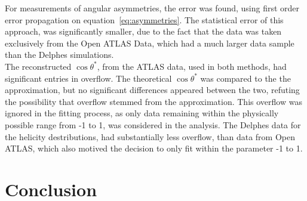 \documentclass[12pt,a4paper]{article}
\numberwithin{equation}{section}
\begin{document}
For measurements of angular asymmetries, the error was found, using first order
error propagation on equation~\eqref{eq:asymmetries}. The statistical error of
this approach, was significantly smaller, due to the fact that the data was
taken exclusively from the Open ATLAS Data, which had a much larger data sample
than the Delphes simulations.\\

The reconstructed $\cos \theta^*$, from the ATLAS data, used in both methods, had
significant entries in overflow. The theoretical $\cos \theta^*$ was compared to the
the approximation, but no significant differences appeared between the two,
refuting the possibility that overflow stemmed from the approximation. This %
overflow was ignored in the fitting process, as only data remaining within the
physically possible range from -1 to 1, was considered in the analysis. The
Delphes data for the helicity destributions, had substantially less overflow,
than data from Open ATLAS, which also motived the decision to only fit within the
parameter -1 to 1.


\section{Conclusion}

\printbibliography
\end{document}
